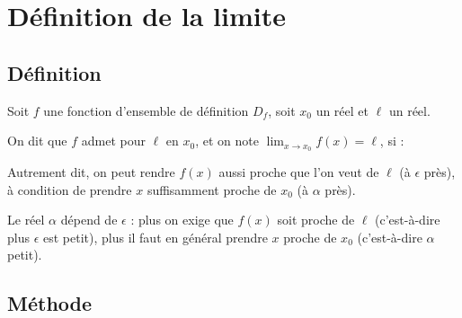 \documentclass[11pt,class=report,crop=false]{standalone}
\begin{document}





\section{Définition de la limite}


\subsection{Définition}

Soit $f$ une fonction d'ensemble de définition $D_f$, soit $x_0$ un réel et $\ell$ un réel.

\begin{definition}
On dit que $f$ admet pour  $\ell$ en $x_0$, et on note $\displaystyle\lim_{x\to x_0} f(x)=\ell$, si :
\end{definition}

Autrement dit, on peut rendre $f(x)$ aussi proche que l'on veut de $\ell$ (à $\epsilon$ près), à condition de prendre $x$ suffisamment proche de $x_0$ (à $\alpha$ près).

\begin{remarque*}
Le réel $\alpha$ dépend de $\epsilon$ : plus on exige que $f(x)$ soit proche de $\ell$ (c'est-à-dire plus $\epsilon$ est petit), plus il faut en général prendre $x$ proche de $x_0$ (c'est-à-dire $\alpha$ petit).
\end{remarque*}


\subsection{Méthode}
\end{document}
